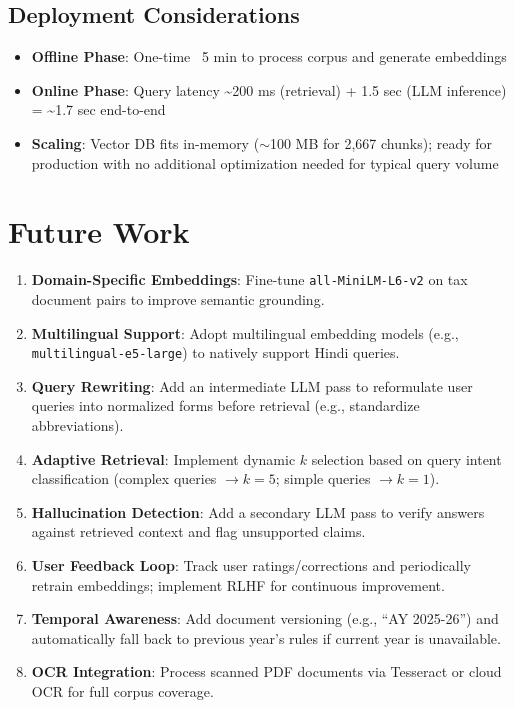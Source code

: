 \documentclass[11pt,a4paper]{article}
\begin{document}
\subsection{Deployment Considerations}

\begin{itemize}
    \item \textbf{Offline Phase}: One-time ~5 min to process corpus and generate embeddings
    \item \textbf{Online Phase}: Query latency \textasciitilde200 ms (retrieval) + 1.5 sec (LLM inference) = \textasciitilde1.7 sec end-to-end
    \item \textbf{Scaling}: Vector DB fits in-memory ($\sim$100 MB for 2,667 chunks); ready for production with no additional optimization needed for typical query volume
\end{itemize}

\section{Future Work}
\label{sec:future}

\begin{enumerate}
    \item \textbf{Domain-Specific Embeddings}: Fine-tune \texttt{all-MiniLM-L6-v2} on tax document pairs to improve semantic grounding.
    
    \item \textbf{Multilingual Support}: Adopt multilingual embedding models (e.g., \texttt{multilingual-e5-large}) to natively support Hindi queries.
    
    \item \textbf{Query Rewriting}: Add an intermediate LLM pass to reformulate user queries into normalized forms before retrieval (e.g., standardize abbreviations).
    
    \item \textbf{Adaptive Retrieval}: Implement dynamic $k$ selection based on query intent classification (complex queries $\rightarrow k=5$; simple queries $\rightarrow k=1$).
    
    \item \textbf{Hallucination Detection}: Add a secondary LLM pass to verify answers against retrieved context and flag unsupported claims.
    
    \item \textbf{User Feedback Loop}: Track user ratings/corrections and periodically retrain embeddings; implement RLHF for continuous improvement.
    
    \item \textbf{Temporal Awareness}: Add document versioning (e.g., ``AY 2025-26'') and automatically fall back to previous year's rules if current year is unavailable.
    
    \item \textbf{OCR Integration}: Process scanned PDF documents via Tesseract or cloud OCR for full corpus coverage.
\end{enumerate}
\end{document}
